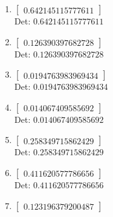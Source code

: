 \documentclass[12pt]{article}
\begin{document}
\begin{enumerate}

\item $\displaystyle \left[\begin{matrix}0.642145115777611\end{matrix}\right]$\\

Det: $0.642145115777611$\\

\item $\displaystyle \left[\begin{matrix}0.126390397682728\end{matrix}\right]$\\

Det: $0.126390397682728$\\

\item $\displaystyle \left[\begin{matrix}0.0194763983969434\end{matrix}\right]$\\

Det: $0.0194763983969434$\\

\item $\displaystyle \left[\begin{matrix}0.014067409585692\end{matrix}\right]$\\

Det: $0.014067409585692$\\

\item $\displaystyle \left[\begin{matrix}0.258349715862429\end{matrix}\right]$\\

Det: $0.258349715862429$\\

\item $\displaystyle \left[\begin{matrix}0.411620577786656\end{matrix}\right]$\\

Det: $0.411620577786656$\\

\item $\displaystyle \left[\begin{matrix}0.123196379200487\end{matrix}\right]$\\


\end{enumerate}
\end{document}
